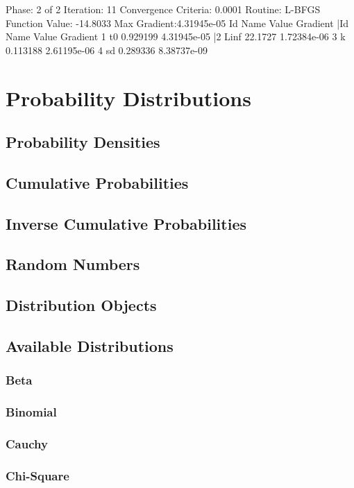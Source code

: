 \documentclass[12pt,a4paper]{article}
\begin{document}
\begin{myoutput}
Phase: 2 of 2
Iteration: 11
Convergence Criteria: 0.0001
Routine: L-BFGS
Function Value: -14.8033
Max Gradient:4.31945e-05
Id      Name      Value          Gradient       |Id      Name      Value          Gradient       
1       t0        0.929199       4.31945e-05    |2       Linf      22.1727        1.72384e-06    
3       k         0.113188       2.61195e-06    4       sd        0.289336       8.38737e-09      
\end{myoutput}  

\section{Probability Distributions}
\subsection{Probability Densities}
\subsection{Cumulative Probabilities}
\subsection{Inverse Cumulative Probabilities}
\subsection{Random Numbers}
\subsection{Distribution Objects}
\subsection{Available Distributions}
\subsubsection{Beta}
\subsubsection{Binomial}
\subsubsection{Cauchy}
\subsubsection{Chi-Square}
\end{document}

